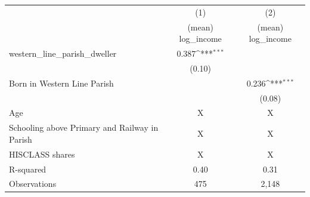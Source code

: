 {
\def\sym#1{\ifmmode^{#1}\else\(^{#1}\)\fi}
\begin{tabular}{l*{2}{c}}
\hline\hline
                    &\multicolumn{1}{c}{(1)}&\multicolumn{1}{c}{(2)}\\
                    &\multicolumn{1}{c}{(mean) log\_income}&\multicolumn{1}{c}{(mean) log\_income}\\
\hline
western\_line\_parish\_dweller&       0.387\sym{***}&                     \\
                    &      (0.10)         &                     \\
Born in Western Line Parish&                     &       0.236\sym{***}\\
                    &                     &      (0.08)         \\
\hline
Age                 &           X         &           X         \\
Schooling above Primary and Railway in Parish&           X         &           X         \\
HISCLASS shares     &           X         &           X         \\
R-squared           &        0.40         &        0.31         \\
Observations        &         475         &       2,148         \\
\hline\hline
\end{tabular}
}

